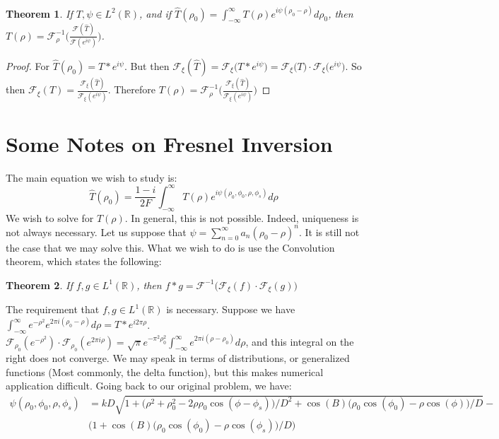 \documentclass{article}
\theoremstyle{mystyle}
\newtheorem{theorem}{Theorem}[section]
\begin{document}
\begin{theorem}
If $T,\psi \in L^2(\mathbb{R})$, and if $\hat{T}(\rho_0) = \int_{-\infty}^{\infty} T(\rho)e^{i\psi(\rho_0-\rho)}d\rho_0$, then $T(\rho) = \mathcal{F}^{-1}_{\rho}\big(\frac{\mathcal{F}(\hat{T})}{\mathcal{F}(e^{i\psi})}\big)$.
\end{theorem}
\begin{proof}
For $\hat{T}(\rho_0) = T* e^{i\psi}$. But then $\mathcal{F}_{\xi}(\hat{T}) = \mathcal{F}_{\xi}\big(T* e^{i\psi}\big) = \mathcal{F}_{\xi}\big(T\big)\cdot \mathcal{F}_{\xi}\big(e^{i\psi}\big)$. So then $\mathcal{F}_{\xi}(T) = \frac{\mathcal{F}_{\xi}(\hat{T})}{\mathcal{F}_{\xi}(e^{i\psi})}$. Therefore $T(\rho) = \mathcal{F}^{-1}_{\rho}\big(\frac{\mathcal{F}_{\xi}(\hat{T})}{\mathcal{F}_{\xi}(e^{i\psi})}\big)$
\end{proof}
\section{Some Notes on Fresnel Inversion}
The main equation we wish to study is:
\begin{equation}
\hat{T}(\rho_0) = \frac{1-i}{2F}\int_{-\infty}^{\infty} T(\rho)e^{i\psi(\rho_0,\phi_0,\rho,\phi_s)}d\rho
\end{equation}
We wish to solve for $T(\rho)$. In general, this is not possible. Indeed, uniqueness is not always necessary. Let us suppose that $\psi = \sum_{n=0}^{\infty}a_n(\rho_0 - \rho)^n$. It is still not the case that we may solve this. What we wish to do is use the Convolution theorem, which states the following:
\begin{theorem}
If $f,g\in L^{1}(\mathbb{R})$, then $f*g = \mathcal{F}^{-1}\big(\mathcal{F}_{\xi}(f)\cdot \mathcal{F}_{\xi}(g)\big)$
\end{theorem}
The requirement that $f,g\in L^{1}(\mathbb{R})$ is necessary. Suppose we have $\int_{-\infty}^{\infty} e^{-\rho^2}e^{2\pi i(\rho_0 - \rho)}d\rho = T*e^{i2\pi \rho}$. $\mathcal{F}_{\rho_0}(e^{-\rho^2})\cdot \mathcal{F}_{\rho_0}(e^{2\pi i \rho}) = \sqrt{\pi}e^{-\pi^2 \rho_0^2}\int_{-\infty}^{\infty}e^{2\pi i(\rho-\rho_0)}d\rho$, and this integral on the right does not converge. We may speak in terms of distributions, or generalized functions (Most commonly, the delta function), but this makes numerical application difficult. Going back to our original problem, we have:
\begin{align}
\nonumber \psi(\rho_0,\phi_0,\rho,\phi_s) &= kD\sqrt{1+\big(\rho^2+\rho_0^2 - 2\rho \rho_0 \cos(\phi - \phi_s)\big)/D^2 + \cos(B)\big(\rho_0\cos(\phi_0) - \rho\cos(\phi)\big)/D} - \\ &\bigg(1+\cos(B)(\rho_0\cos(\phi_0) - \rho\cos(\phi_s)\big)/D\bigg)
\end{align}
\end{document}
